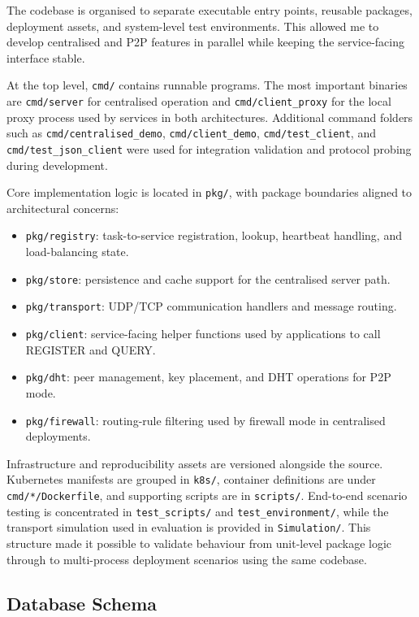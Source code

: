 \documentclass[10pt,a4paper]{article}
\begin{document}
The codebase is organised to separate executable entry points, reusable packages, deployment assets, and system-level test environments. This allowed me to develop centralised and P2P features in parallel while keeping the service-facing interface stable.

At the top level, \texttt{cmd/} contains runnable programs. The most important binaries are \texttt{cmd/server} for centralised operation and \texttt{cmd/client\_proxy} for the local proxy process used by services in both architectures. Additional command folders such as \texttt{cmd/centralised\_demo}, \texttt{cmd/client\_demo}, \texttt{cmd/test\_client}, and \texttt{cmd/test\_json\_client} were used for integration validation and protocol probing during development.

Core implementation logic is located in \texttt{pkg/}, with package boundaries aligned to architectural concerns:
\begin{itemize}
    \item \texttt{pkg/registry}: task-to-service registration, lookup, heartbeat handling, and load-balancing state.
    \item \texttt{pkg/store}: persistence and cache support for the centralised server path.
    \item \texttt{pkg/transport}: UDP/TCP communication handlers and message routing.
    \item \texttt{pkg/client}: service-facing helper functions used by applications to call REGISTER and QUERY.
    \item \texttt{pkg/dht}: peer management, key placement, and DHT operations for P2P mode.
    \item \texttt{pkg/firewall}: routing-rule filtering used by firewall mode in centralised deployments.
\end{itemize}

Infrastructure and reproducibility assets are versioned alongside the source. Kubernetes manifests are grouped in \texttt{k8s/}, container definitions are under \texttt{cmd/*/Dockerfile}, and supporting scripts are in \texttt{scripts/}. End-to-end scenario testing is concentrated in \texttt{test\_scripts/} and \texttt{test\_environment/}, while the transport simulation used in evaluation is provided in \texttt{Simulation/}. This structure made it possible to validate behaviour from unit-level package logic through to multi-process deployment scenarios using the same codebase.

\subsection{Database Schema}
\end{document}
